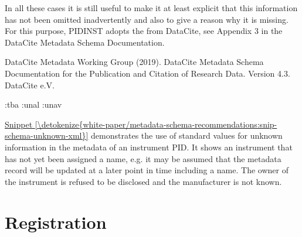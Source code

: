 \documentclass[a4paper,10pt,english]{sphinxmanual}
\begin{document}
\sphinxAtStartPar
In all these cases it is still useful to make it at least explicit
that this information has not been omitted inadvertently and also to
give a reason why it is missing.  For this purpose, PIDINST adopts the
 from DataCite, see Appendix
3 in the DataCite Metadata Schema Documentation.%
\begin{footnote}[3]\sphinxAtStartFootnote
DataCite Metadata Working Group (2019).  DataCite Metadata Schema
Documentation for the Publication and Citation of Research Data.
Version 4.3.  DataCite e.V.  
%
\end{footnote}
\def\sphinxLiteralBlockLabel{\label{\detokenize{white-paper/metadata-schema-recommendations:snip-schema-unknown-xml}}}
\begin{sphinxVerbatim}[commandchars=\\\{\}]
  :tba
        :unal
        :unav
\end{sphinxVerbatim}

\sphinxAtStartPar
\hyperref[\detokenize{white-paper/metadata-schema-recommendations:snip-schema-unknown-xml}]{Snippet \ref{\detokenize{white-paper/metadata-schema-recommendations:snip-schema-unknown-xml}}} demonstrates the use of standard
values for unknown information in the metadata of an instrument PID.
It shows an instrument that has not yet been assigned a name, e.g. it
may be assumed that the metadata record will be updated at a later
point in time including a name.  The owner of the instrument is
refused to be disclosed and the manufacturer is not known.


\section{Registration}
\label{\detokenize{white-paper/registration:registration}}\label{\detokenize{white-paper/registration::doc}}
\end{document}
